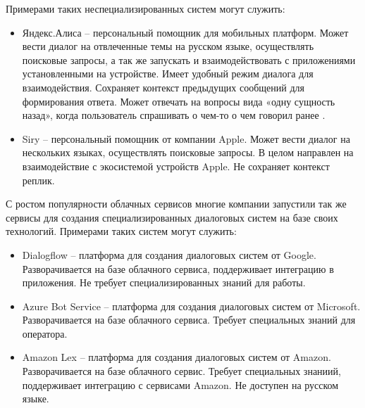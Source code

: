 Примерами таких неспециализированных систем могут служить: 
\begin{itemize}
\item Яндекс.Алиса – персональный помощник для мобильных платформ. Может вести диалог на отвлеченные темы на русском языке, осуществлять поисковые запросы, а так же запускать и взаимодействовать с приложениями установленными на устройстве. Имеет удобный режим диалога для взаимодействия. Сохраняет контекст предыдущих сообщений для формирования ответа. Может отвечать на вопросы вида «одну сущность назад», когда пользователь спрашивать о чем-то о чем говорил ранее \cite{fonarev2017riemannian}. 
\item Siry – персональный помощник от компании Apple. Может вести диалог на нескольких языках, осуществлять поисковые запросы. В целом направлен на взаимодействие с экосистемой устройств Apple. Не сохраняет контекст реплик. 
\end{itemize}
С ростом популярности облачных сервисов многие компании запустили так же сервисы для создания специализированных диалоговых систем на базе своих технологий. 
Примерами таких систем могут служить:
\begin{itemize}
    \item Dialogflow – платформа для создания диалоговых систем от Google. Разворачивается на базе облачного сервиса, поддерживает интеграцию в приложения. Не требует специализированных знаний для работы.
    \item Azure Bot Service – платформа для создания диалоговых систем от Microsoft. Разворачивается на базе облачного сервиса. Требует специальных знаний для оператора.
    \item Amazon Lex – платформа для создания диалоговых систем от Amazon. Разворачивается на базе облачного сервис. Требует специальных знаниий, поддерживает интеграцию с сервисами Amazon. Не доступен на русском языке. 
\end{itemize}
 
 
